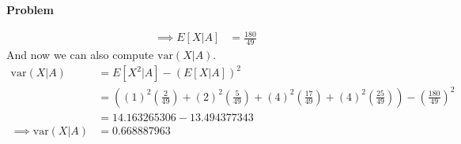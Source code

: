\documentclass[12pt]{article}
\newenvironment{Ex}{\textbf{Problem}\vspace{.75em}\\}{}
\begin{document}
\begin{enumerate}
\begin{Ex}
\begin{solution}
\begin{enumerate}
\begin{equation}
\begin{aligned}
            \implies E[X|A] &= \frac{180}{49}
          \end{aligned}
        \end{equation}
        And now we can also compute $\text{var}(X|A)$.
        \begin{equation}
          \label{eq:2g-var-x-given-a}
          \begin{aligned}
            \text{var}(X|A) &= E[X^2|A] - (E[X|A])^2 \\
            &= \left((1)^2\left(\frac{2}{49}\right) +
            (2)^2\left(\frac{5}{49}\right) +
            (4)^2\left(\frac{17}{49}\right) +
            (4)^2\left(\frac{25}{49}\right)\right) -
            \left(\frac{180}{49}\right)^2 \\
            &= 14.163265306 - 13.494377343 \\
            \implies \text{var}(X|A) &=  0.668887963 \\
          \end{aligned}
        \end{equation}


\end{enumerate}
\end{solution}
\end{Ex}
\end{enumerate}
\end{document}
